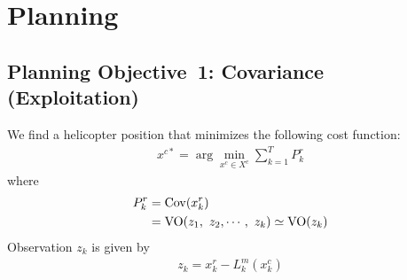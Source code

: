 \documentclass[conference]{IEEEtran}
\begin{document}


\section{Planning}
\subsection{Planning Objective~1: Covariance (Exploitation)}

We find a helicopter position that minimizes the following cost function:
\begin{align}
    x^{c*}=\arg\min_{x^c \in X^c} \sum^T_{k=1} P^r_k
\end{align}
where
\begin{align}
P^r_k&={\rm Cov}(x^r_k)\\
&={\rm VO}(z_1,~z_2,\cdots,~z_k)\simeq {\rm VO}(z_k)
\end{align}
Observation $z_k$ is given by
\begin{align}
z_k=x^r_k-L^m_k(x^c_k)
\end{align}
\end{document}
